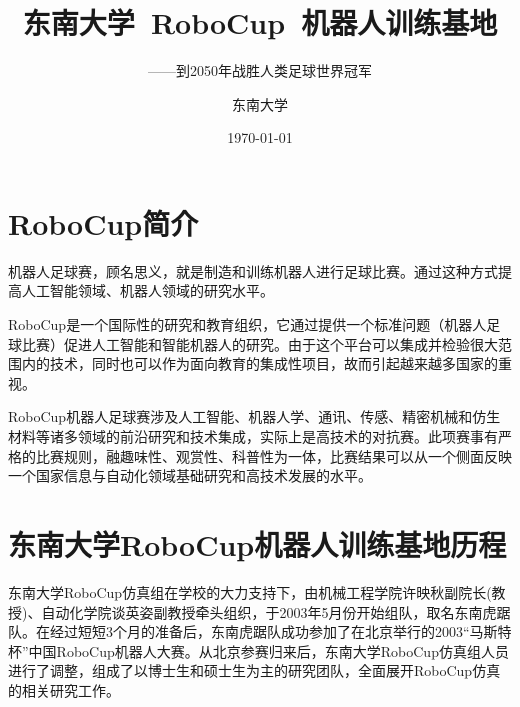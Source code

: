 


\title{东南大学~RoboCup~机器人训练基地}
\subtitle{——到2050年战胜人类足球世界冠军}
\author{东南大学}

\date{\today}


\maketitle

\chapter{RoboCup简介}

机器人足球赛，顾名思义，就是制造和训练机器人进行足球比赛。通过这种方式提高人工智能领域、机器人领域的研究水平。

RoboCup是一个国际性的研究和教育组织，它通过提供一个标准问题（机器人足球比赛）促进人工智能和智能机器人的研究。由于这个平台可以集成并检验很大范围内的技术，同时也可以作为面向教育的集成性项目，故而引起越来越多国家的重视。

RoboCup机器人足球赛涉及人工智能、机器人学、通讯、传感、精密机械和仿生材料等诸多领域的前沿研究和技术集成，实际上是高技术的对抗赛。此项赛事有严格的比赛规则，融趣味性、观赏性、科普性为一体，比赛结果可以从一个侧面反映一个国家信息与自动化领域基础研究和高技术发展的水平。


\chapter{东南大学RoboCup机器人训练基地历程}

东南大学RoboCup仿真组在学校的大力支持下，由机械工程学院许映秋副院长(教授)、自动化学院谈英姿副教授牵头组织，于2003年5月份开始组队，取名东南虎踞队。在经过短短3个月的准备后，东南虎踞队成功参加了在北京举行的2003“马斯特杯”中国RoboCup机器人大赛。从北京参赛归来后，东南大学RoboCup仿真组人员进行了调整，组成了以博士生和硕士生为主的研究团队，全面展开RoboCup仿真的相关研究工作。

